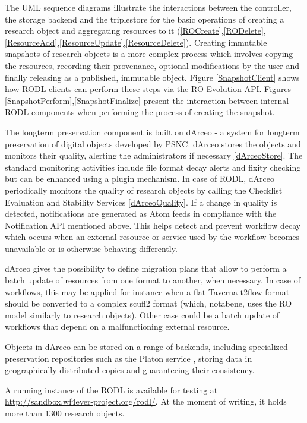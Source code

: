 The UML sequence diagrams illustrate the interactions between the controller, the storage backend and the triplestore for the basic operations of creating a research object and aggregating resources to it (\ref{ROCreate},\ref{RODelete},\ref{ResourceAdd},\ref{ResourceUpdate},\ref{ResourceDelete}). Creating immutable snapshots of research objects is a more complex process which involves copying the resources, recording their provenance, optional modifications by the user and finally releasing as a published, immutable object. Figure \ref{SnapshotClient} shows how RODL clients can perform these steps via the RO Evolution API. Figures \ref{SnapshotPerform},\ref{SnapshotFinalize} present the interaction between internal RODL components when performing the process of creating the snapshot.

The longterm preservation component is built on dArceo \cite{dArceo} - a system for longterm preservation of digital objects developed by PSNC. dArceo stores the objects and monitors their quality, alerting the administrators if necessary \ref{dArceoStore}. The standard monitoring activities include file format decay alerts and fixity checking but can be enhanced using a plugin mechanism. In case of RODL, dArceo periodically monitors the quality of research objects by calling the Checklist Evaluation and Stability Services \cite{Checklist-API,Stability-API} \ref{dArceoQuality}. If a change in quality is detected, notifications are generated as Atom feeds in compliance with the Notification API mentioned above. This helps detect and prevent workflow decay which occurs when an external resource or service used by the workflow becomes unavailable or is otherwise behaving differently.

dArceo gives the possibility to define migration plans that allow to perform a batch update of resources from one format to another, when necessary. In case of workflows, this may be applied for instance when a flat Taverna t2flow format should be converted to a complex scufl2 format (which, notabene, uses the RO model similarly to research objects). Other case could be a batch update of workflows that depend on a malfunctioning external resource.

Objects in dArceo can be stored on a range of backends, including specialized preservation repositories such as the Platon service \cite{Platon}, storing data in geographically distributed copies and guaranteeing their consistency.

A running instance of the RODL is available for testing at \url{http://sandbox.wf4ever-project.org/rodl/}. At the moment of writing, it holds more than 1300 research objects.


